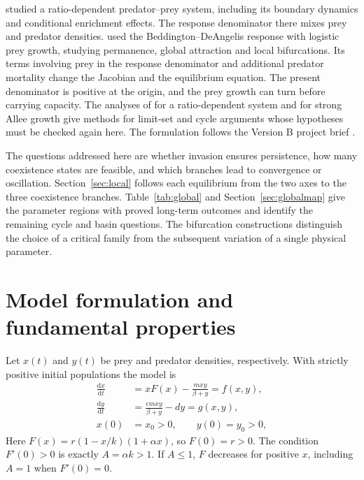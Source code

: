 \documentclass[12pt,a4paper,twoside,fleqn]{article}
\theoremstyle{journal}
\newcommand{\dd}{\mathrm{d}}
\begin{document}
\citet{haque09} studied a ratio-dependent predator--prey system, including its boundary dynamics and conditional enrichment effects. The response denominator there mixes prey and predator densities. \citet{haque11} used the Beddington--DeAngelis response with logistic prey growth, studying permanence, global attraction and local bifurcations. Its terms involving prey in the response denominator and additional predator mortality change the Jacobian and the equilibrium equation. The present denominator is positive at the origin, and the prey growth can turn before carrying capacity. The analyses of \citet{hsu01} for a ratio-dependent system and \citet{wang11} for strong Allee growth give methods for limit-set and cycle arguments whose hypotheses must be checked again here. The formulation follows the Version B project brief \citep{brief}.

The questions addressed here are whether invasion ensures persistence, how many coexistence states are feasible, and which branches lead to convergence or oscillation. Section~\ref{sec:local} follows each equilibrium from the two axes to the three coexistence branches. Table~\ref{tab:global} and Section~\ref{sec:globalmap} give the parameter regions with proved long-term outcomes and identify the remaining cycle and basin questions. The bifurcation constructions distinguish the choice of a critical family from the subsequent variation of a single physical parameter.

\section{Model formulation and fundamental properties}\label{sec:model}
Let \(x(t)\) and \(y(t)\) be prey and predator densities, respectively. With strictly positive initial populations the model is
\begin{equation}\label{eq:ode}
 \begin{aligned}
 \frac{\dd x}{\dd t}&=xF(x)-\frac{mxy}{\beta+y}=f(x,y),\\
 \frac{\dd y}{\dd t}&=\frac{emxy}{\beta+y}-dy=g(x,y),\\
 x(0)&=x_0>0,\qquad y(0)=y_0>0,
 \end{aligned}
\end{equation}
Here \(F(x)=r(1-x/k)(1+\alpha x)\), so \(F(0)=r>0\). The condition \(F'(0)>0\) is exactly \(A=\alpha k>1\). If \(A\le1\), \(F\) decreases for positive \(x\), including \(A=1\) when \(F'(0)=0\).
\end{document}
